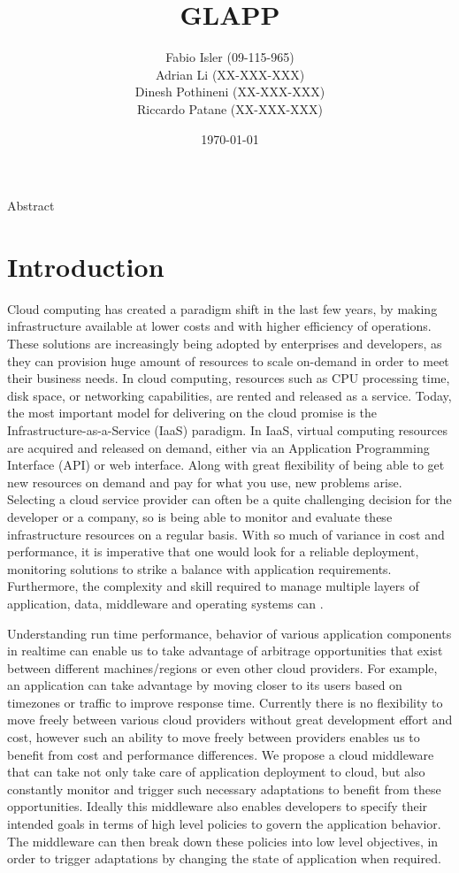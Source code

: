 \documentclass{seal_thesis}
\date{\today}
\title{GLAPP}
\subtitle{}
\author{
Fabio Isler \textmd{(09-115-965)} \\
Adrian Li \textmd{(XX-XXX-XXX)} \\
Dinesh Pothineni \textmd{(XX-XXX-XXX)} \\
Riccardo Patane \textmd{(XX-XXX-XXX)}}
\begin{document}
\maketitle

\abstract
Abstract


\chapter{Introduction}
Cloud computing has created a paradigm shift in the last few years, by making infrastructure available at lower costs and with higher efficiency of operations.
These solutions are increasingly being adopted by enterprises and developers, as they can provision huge amount of resources to scale on-demand in order to meet their business needs.
In cloud computing, resources such as CPU processing time, disk space, or networking capabilities, are rented and released as a service.
Today, the most important model for delivering on the cloud promise is the Infrastructure-as-a-Service (IaaS) paradigm.
In IaaS, virtual computing resources are acquired and released on demand, either via an Application Programming Interface (API) or web interface.
Along with great flexibility of being able to get new resources on demand and pay for what you use, new problems arise.
Selecting a cloud service provider can often be a quite challenging decision for the developer or a company, so is being able to monitor and evaluate these infrastructure resources on a regular basis.
With so much of variance in cost and performance, it is imperative that one would look for a reliable deployment, monitoring solutions to strike a balance with application requirements.
Furthermore, the complexity and skill required to manage multiple layers of application, data, middleware and operating systems can .

Understanding run time performance, behavior of various application components in realtime can enable us to take advantage of arbitrage opportunities that exist between different machines/regions or even other cloud providers.
For example, an application can take advantage by moving closer to its users based on timezones or traffic to improve response time.
Currently there is no flexibility to move freely between various cloud providers without great development effort and cost, however such an ability to move freely between providers enables us to benefit from cost and performance differences.
We propose a cloud middleware that can take not only take care of application deployment to cloud, but also constantly monitor and trigger such necessary adaptations to benefit from these opportunities.
Ideally this middleware also enables developers to specify their intended goals in terms of high level policies to govern the application behavior.
The middleware can then break down these policies into low level objectives, in order to trigger adaptations by changing the state of application when required.
\end{document}
